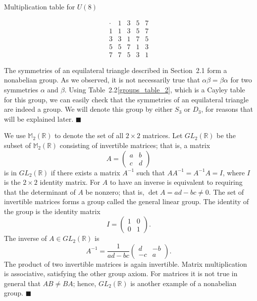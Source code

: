 \begin{table}[htb]\label{groups_table_4}
\caption{Multiplication table for $U(8)$}{\small
$$
\begin{array}{c|cccc}
\cdot & 1 & 3 & 5 & 7 \\
\hline
1     & 1 & 3 & 5 & 7 \\
3     & 3 & 1 & 7 & 5 \\
5     & 5 & 7 & 1 & 3 \\
7     & 7 & 5 & 3 & 1
\end{array}
$$
}
\end{table}

\medskip

The symmetries of an equilateral triangle described in Section~2.1 form a nonabelian group. As we observed, it is not necessarily true that $\alpha \beta = \beta \alpha$ for two symmetries $\alpha$ and $\beta$.  Using Table~2.2\ref{groups_table_2}, which is a Cayley table for this group, we can easily check that the symmetries of an equilateral triangle are indeed a group. We will denote this group by either $S_3$ or $D_3$, for reasons that will be explained later. 
\hspace{\fill} $\blacksquare$

\medskip

We use  ${\mathbb M}_2 ( {\mathbb R})$\label{notematrices} to denote the set of all $2 \times 2$ matrices.  Let $GL_2({\mathbb R})$ be the subset of ${\mathbb M}_2 ( {\mathbb R})$ consisting of invertible matrices; that is, a matrix 
$$
A =
\begin{pmatrix}
a & b \\
c & d
\end{pmatrix}
$$
is in  $GL_2( {\mathbb R})$ if there exists a matrix $A^{-1}$ such that
$A A^{-1} = A^{-1} A = I$, where $I$ is the $2 \times 2$ identity
matrix. For $A$ to have an inverse is equivalent to requiring that the
determinant of $A$ be nonzero; that is, $\det A = ad - bc \neq
0$\label{determinant}. The set of invertible matrices forms a group
called the {\bfi general linear group}\label{generallinear}. The identity of the group is the
identity matrix  
$$
I =
\left(
\begin{array}{cc}
1 & 0 \\
0 & 1
\end{array}
\right).
$$
The inverse of $A \in GL_2( {\mathbb R})$ is
$$
A^{-1} =
\frac{1}{ad-bc}
\left(
\begin{array}{cc}
d & -b \\
-c & a
\end{array}
\right).
$$
The product of two invertible matrices is again invertible. Matrix
multiplication is associative, satisfying the other group axiom. For
matrices it is not true in general that $AB \neq BA$; hence, $GL_2(
{\mathbb R})$ is another example of a nonabelian group.
\hspace{\fill} $\blacksquare$
 
